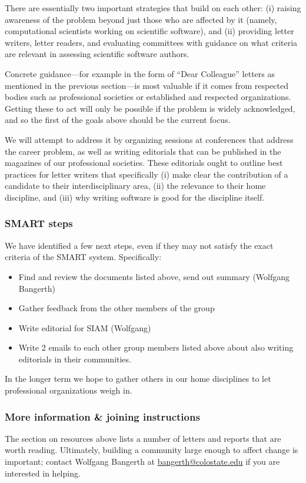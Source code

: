 There are essentially two important strategies that build on each
other: (i) raising awareness of the problem beyond just those who are
affected by it (namely, computational scientists working on scientific
software), and (ii) providing letter writers, letter readers, and
evaluating committees with guidance on what criteria are relevant in
assessing scientific software authors.

Concrete guidance---for example in the form of ``Dear Colleague''
letters as mentioned in the previous section---is most valuable if it
comes from respected bodies such as professional societies or
established and respected organizations. Getting these to act
will only be possible if the problem is widely acknowledged, and so
the first of the goals above should be the current focus.

We will attempt to address it by organizing sessions at conferences
that address the career problem, as well as writing editorials that
can be published in the magazines of our professional societies. These
editorials ought to outline best practices for letter writers that
specifically (i) make clear the contribution of a candidate to their
interdisciplinary area, (ii) the relevance to their home discipline, and
(iii) why writing software is good for the discipline itself.


\subsubsection{SMART steps}

We have identified a few next steps, even if they may not satisfy the
exact criteria of the SMART system. Specifically:
\begin{itemize}
  \item Find and review the documents listed above, send out summary
    (Wolfgang Bangerth)
  \item Gather feedback from the other members of the group
  \item Write editorial for SIAM (Wolfgang)
  \item Write 2 emails to each other group members listed above about
    also writing editorials in their communities.
\end{itemize}
In the longer term we hope to gather others in our home disciplines to
let professional organizations weigh in.


\subsubsection{More information \& joining instructions}

The section on resources above lists a number of letters and reports
that are worth reading. Ultimately, building a community large enough
to affect change is important; contact Wolfgang Bangerth at
\url{bangerth@colostate.edu} if you are interested in helping.
